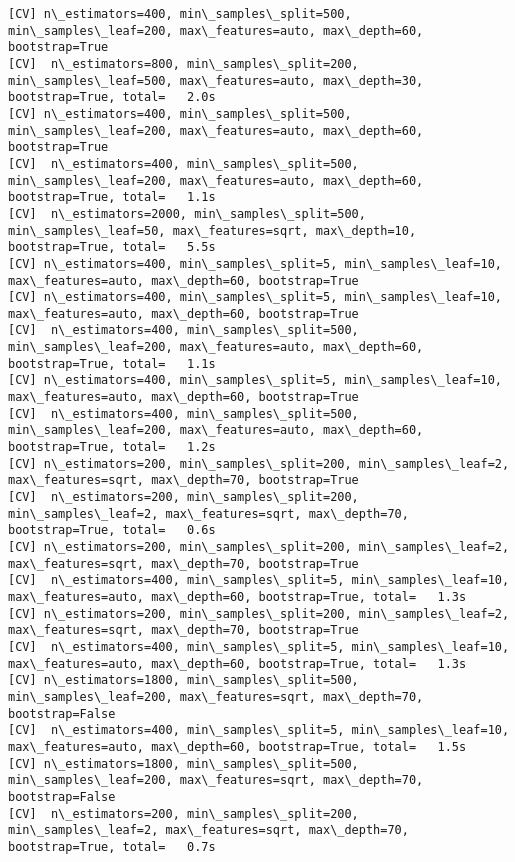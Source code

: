 \documentclass[11pt]{article}
\begin{document}
\begin{Verbatim}[commandchars=\\\{\}]
[CV] n\_estimators=400, min\_samples\_split=500, min\_samples\_leaf=200, max\_features=auto, max\_depth=60, bootstrap=True 
[CV]  n\_estimators=800, min\_samples\_split=200, min\_samples\_leaf=500, max\_features=auto, max\_depth=30, bootstrap=True, total=   2.0s
[CV] n\_estimators=400, min\_samples\_split=500, min\_samples\_leaf=200, max\_features=auto, max\_depth=60, bootstrap=True 
[CV]  n\_estimators=400, min\_samples\_split=500, min\_samples\_leaf=200, max\_features=auto, max\_depth=60, bootstrap=True, total=   1.1s
[CV]  n\_estimators=2000, min\_samples\_split=500, min\_samples\_leaf=50, max\_features=sqrt, max\_depth=10, bootstrap=True, total=   5.5s
[CV] n\_estimators=400, min\_samples\_split=5, min\_samples\_leaf=10, max\_features=auto, max\_depth=60, bootstrap=True 
[CV] n\_estimators=400, min\_samples\_split=5, min\_samples\_leaf=10, max\_features=auto, max\_depth=60, bootstrap=True 
[CV]  n\_estimators=400, min\_samples\_split=500, min\_samples\_leaf=200, max\_features=auto, max\_depth=60, bootstrap=True, total=   1.1s
[CV] n\_estimators=400, min\_samples\_split=5, min\_samples\_leaf=10, max\_features=auto, max\_depth=60, bootstrap=True 
[CV]  n\_estimators=400, min\_samples\_split=500, min\_samples\_leaf=200, max\_features=auto, max\_depth=60, bootstrap=True, total=   1.2s
[CV] n\_estimators=200, min\_samples\_split=200, min\_samples\_leaf=2, max\_features=sqrt, max\_depth=70, bootstrap=True 
[CV]  n\_estimators=200, min\_samples\_split=200, min\_samples\_leaf=2, max\_features=sqrt, max\_depth=70, bootstrap=True, total=   0.6s
[CV] n\_estimators=200, min\_samples\_split=200, min\_samples\_leaf=2, max\_features=sqrt, max\_depth=70, bootstrap=True 
[CV]  n\_estimators=400, min\_samples\_split=5, min\_samples\_leaf=10, max\_features=auto, max\_depth=60, bootstrap=True, total=   1.3s
[CV] n\_estimators=200, min\_samples\_split=200, min\_samples\_leaf=2, max\_features=sqrt, max\_depth=70, bootstrap=True 
[CV]  n\_estimators=400, min\_samples\_split=5, min\_samples\_leaf=10, max\_features=auto, max\_depth=60, bootstrap=True, total=   1.3s
[CV] n\_estimators=1800, min\_samples\_split=500, min\_samples\_leaf=200, max\_features=sqrt, max\_depth=70, bootstrap=False 
[CV]  n\_estimators=400, min\_samples\_split=5, min\_samples\_leaf=10, max\_features=auto, max\_depth=60, bootstrap=True, total=   1.5s
[CV] n\_estimators=1800, min\_samples\_split=500, min\_samples\_leaf=200, max\_features=sqrt, max\_depth=70, bootstrap=False 
[CV]  n\_estimators=200, min\_samples\_split=200, min\_samples\_leaf=2, max\_features=sqrt, max\_depth=70, bootstrap=True, total=   0.7s

\end{Verbatim}
\end{document}

